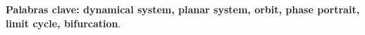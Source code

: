 \textbf{\small Palabras clave: dynamical system, planar system, orbit, phase portrait, limit cycle, bifurcation}.\\
%
%
%
%
%
%
%
%
%
